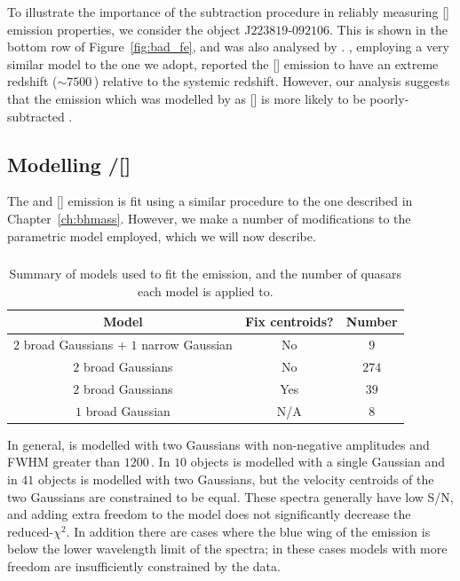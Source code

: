 To illustrate the importance of the  subtraction procedure in reliably measuring [] emission properties, we consider the object J$223819$-$092106$. 
This is shown in the bottom row of Figure~\ref{fig:bad_fe}, and was also analysed by \citet{shen16a}.
\citet{shen16a}, employing a very similar model to the one we adopt, reported the [] emission to have an extreme redshift ($\sim7500$\,\kms) relative to the \citet{hewett10} systemic redshift.
However, our analysis suggests that the emission which was modelled by \citet{shen16a} as [] is more likely to be poorly-subtracted .  

\subsection{Modelling \hbns/[]}
\label{sec:oiiimodel}

The \hb and [] emission is fit using a similar procedure to the one described in Chapter~\ref{ch:bhmass}. 
However, we make a number of modifications to the parametric model employed, which we will now describe. 

\subsubsection{\hb}

\begin{table}
  \centering
  \footnotesize 
  \caption{Summary of models used to fit the \hb emission, and the number of quasars each model is applied to.}
  \label{tab:hbmod}
    \begin{tabular}{ccc} 
    \hline
    Model & Fix centroids? & Number \\
    \hline
    $2$ broad Gaussians + $1$ narrow Gaussian & No & $9$ \\
    $2$ broad Gaussians & No  &  $274$ \\
    $2$ broad Gaussians & Yes &  $39$ \\
    $1$ broad Gaussian  & N/A &  $8$ \\
    \hline
    \end{tabular}
\end{table} 

In general, \hb is modelled with two Gaussians with non-negative amplitudes and FWHM greater than $1200$\,\kms.
In $10$ objects \hb is modelled with a single Gaussian and in $41$ objects \hb is modelled with two Gaussians, but the velocity centroids of the two Gaussians are constrained to be equal. 
These spectra generally have low S/N, and adding extra freedom to the model does not significantly decrease the  reduced-$\chi^2$.
In addition there are cases where the blue wing of the \hb emission is below the lower wavelength limit of the spectra; in these cases models with more freedom are insufficiently constrained by the data.    

